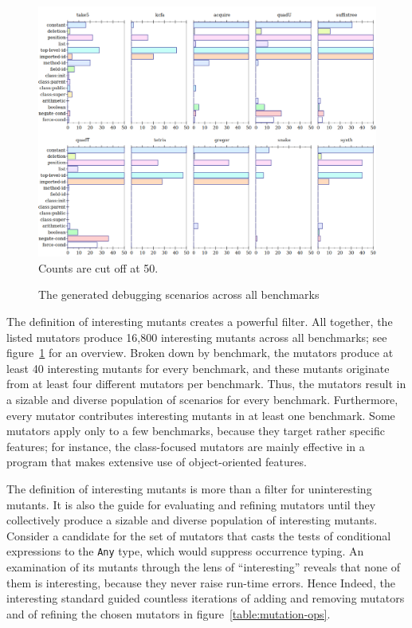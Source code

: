 \begin{figure} \footnotesize
 \centering
 \includegraphics[scale=0.33]{./plots/mutant-breakdown}
  Counts are cut off at 50.

\caption{The generated debugging scenarios across all benchmarks} 
 \label{fig:mutant-breakdown}
\end{figure}

The definition of interesting mutants creates a powerful filter. All
together, the listed mutators produce 16,800 interesting mutants across all benchmarks; see
figure~\ref{fig:mutant-breakdown} for an overview. Broken down by benchmark, the
mutators produce at least 40 interesting mutants for every benchmark, and
these mutants originate from at least four different mutators per benchmark.
Thus, the mutators result in a sizable and diverse population of scenarios for
every benchmark.  Furthermore, every mutator contributes interesting mutants in at least
one benchmark.  Some mutators apply only to a few benchmarks, because they
target rather specific features; for instance, the class-focused mutators are
mainly effective in a program that makes extensive use of object-oriented
features.

The definition of interesting mutants is more than a filter for uninteresting
mutants. It is also the guide for evaluating and refining mutators until they
collectively produce a sizable and diverse population of interesting
mutants. Consider a candidate for the set of mutators that casts the tests of conditional
expressions to the {\tt Any} type, which would suppress occurrence typing. An
examination of its mutants through the lens of ``interesting'' reveals that none
of them is interesting, because they never raise run-time errors. Hence Indeed,
the interesting standard guided countless iterations of adding and removing
mutators and of refining the chosen mutators in figure~\ref{table:mutation-ops}.

